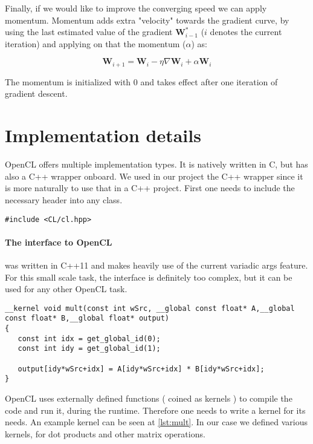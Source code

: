 Finally, if we would like to improve the converging speed we can apply momentum. Momentum adds extra "velocity" towards the gradient curve, by using the last estimated value of the gradient $\mathbf{W}^{*}_{i-1}$ ($i$ denotes the current iteration) and applying on that the momentum ($ \alpha$) as:

\begin{equation}
\mathbf{W}_{i+1} = \mathbf{W}_i - \eta \nabla \mathbf{W}_i + \alpha \mathbf{W}_i
\end{equation}

The momentum is initialized with 0 and takes effect after one iteration of gradient descent.

\section{Implementation details}

OpenCL offers multiple implementation types. It is natively written in C, but has also a C++ wrapper onboard. We used in our project the C++ wrapper since it is more naturally to use that in a C++ project.
First one needs to include the necessary header into any class.

\begin{lstlisting}[caption=OpenCL C++ header]
#include <CL/cl.hpp>
\end{lstlisting}


\paragraph{The interface to OpenCL} was written in C++11 and makes heavily use of the current variadic args feature. For this small scale task, the interface is definitely too complex, but it can be used for any other OpenCL task.

\label{lst:mult}
\begin{lstlisting}[caption=Example Kernel function]
__kernel void mult(const int wSrc, __global const float* A,__global const float* B,__global float* output)
{
   const int idx = get_global_id(0);
   const int idy = get_global_id(1);

   output[idy*wSrc+idx] = A[idy*wSrc+idx] * B[idy*wSrc+idx];
}
\end{lstlisting}
OpenCL uses externally defined functions ( coined as kernels ) to compile the code and run it, during the runtime. Therefore one needs to write a kernel for its needs. An example kernel can be seen at \ref{lst:mult}. In our case we defined various kernels, for dot products and other matrix operations.

